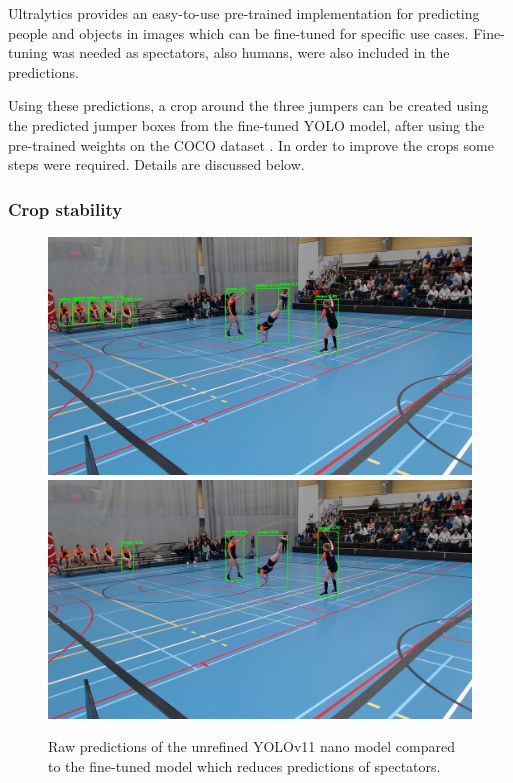 Ultralytics \autocite{Khanam2024} provides an easy-to-use pre-trained implementation for predicting people and objects in images which can be fine-tuned for specific use cases. Fine-tuning was needed as spectators, also humans, were also included in the predictions.

Using these predictions, a crop around the three jumpers can be created using the predicted jumper boxes from the fine-tuned YOLO model, after using the pre-trained weights on the COCO dataset \autocite{Lin2014}. In order to improve the crops some steps were required. Details are discussed below.

\subsubsection{Crop stability}

\begin{figure}
    \centering
    \includegraphics[width=0.95\linewidth]{img/1267_292_boxes}
    \includegraphics[width=0.95\linewidth]{img/1267_292_boxes_reduced_spectators}
    \caption[raw vs fine-tuned YOLOv11 nano model predictions]{Raw predictions of the unrefined YOLOv11 nano model compared to the fine-tuned model which reduces predictions of spectators.}
    \label{fig:raw-vs-fine-tuned-boxes}
\end{figure}

